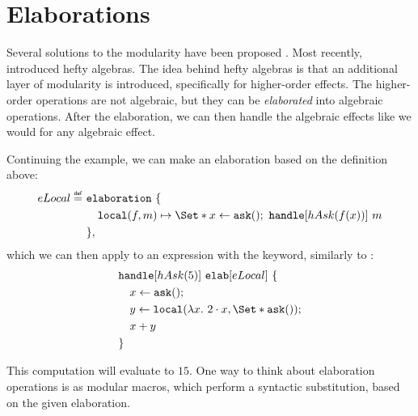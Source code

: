 \section{Elaborations}\label{sec:elab}

Several solutions to the modularity have been proposed \autocite{wu_effect_2014, oh_latent_2021}. Most recently, \textcite{bach_poulsen_hefty_2023} introduced hefty algebras. The idea behind hefty algebras is that an additional layer of modularity is introduced, specifically for higher-order effects. The higher-order operations are not algebraic, but they can be \emph{elaborated} into algebraic operations. After the elaboration, we can then handle the algebraic effects like we would for any algebraic effect.

Continuing the \olocal example, we can make an elaboration based on the definition above:
\begin{align*}
    eLocal \defeq\ 
        &\elaboration\ \{ \\
        &\quad\olocal(f, m) \mapsto \S{x \gets \oask()\seq \handle[hAsk(f(x))]\ m }\\
        &\},
\end{align*}
which we can then apply to an expression with the \elab keyword, similarly to \handle:
\begin{align*}
    &\handle[hAsk(5)]\ \elab[eLocal]\ \{ \\
    &\quad x \gets \oask();\\
    &\quad y \gets \olocal(\lambda x.\ 2\cdot x, \S{ \oask() });\\
    &\quad x + y \\
    &\}
\end{align*}

This computation will evaluate to $15$. One way to think about elaboration operations is as modular macros, which perform a syntactic substitution, based on the given elaboration.

